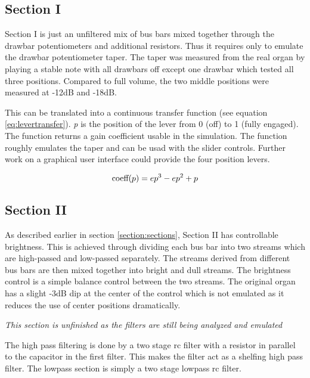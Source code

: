 \documentclass[11pt,a4paper]{article}
\begin{document}

\subsection{Section I}
\label{section:section-I}

Section I is just an unfiltered mix of bus bars mixed together through the drawbar potentiometers and additional resistors. Thus it requires only to emulate the drawbar potentiometer taper. The taper was measured from the real organ by playing a stable note with all drawbars off except one drawbar which tested all three positions. Compared to full volume, the two middle positions were measured at -12dB and -18dB.

This can be translated into a continuous transfer function (see equation \ref{eq:levertransfer}). \emph{p} is the position of the lever from 0 (off) to 1 (fully engaged). The function returns a gain coefficient usable in the simulation. The function roughly emulates the taper and can be usad with the slider controls. Further work on a graphical user interface could provide the four position levers.


\begin{equation}
\label{eq:levertransfer}
\mbox{coeff}(p) = e p^3 - e p^2 + p\\
\end{equation}



\subsection{Section II}

As described earlier in section \ref{section:sections}, Section II has controllable brightness. This is achieved through dividing each bus bar into two streams which are high-passed and low-passed separately. The streams derived from different bus bars are then mixed together into bright and dull streams. The brightness control is a simple balance control between the two streams. The original organ has a slight -3dB dip at the center of the control which is not emulated as it reduces the use of center positions dramatically.

\emph{This section is unfinished as the filters are still being analyzed and emulated}

The high pass filtering is done by a two stage rc filter with a resistor in parallel to the capacitor in the first filter. This makes the filter act as a shelfing high pass filter. The lowpass section is simply a two stage lowpass rc filter.
\end{document}
